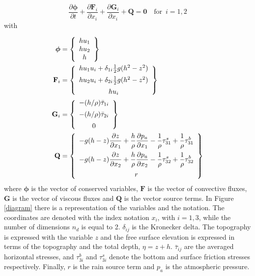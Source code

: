 \documentclass[a4paper,12pt]{article}
\newcommand{\pder}[2]{\frac{\partial#1}{\partial#2}}
\begin{document}
\begin{equation} \label{general_sw}
\pder{\bm{\phi}}{t} + \pder{\mathbf{F}_i}{x_i} + \pder{\mathbf{G}_i}{x_i} + \mathbf{Q} = \mathbf{0} \quad \text{for} \enspace i=1,2
\end{equation}
with

\begin{subequations}\label{variables_and_fluxes}
\allowdisplaybreaks
\begin{align}
\bm{\phi} &= \left\{
    \begin{array}{c}
        hu_1 \\
        hu_2 \\
        h
    \end{array}\right\} \\
\mathbf{F}_i &= \left\{
    \begin{array}{c}
        hu_1u_i + \delta_{1i}\frac{1}{2}g(h^2 - z^2) \\ [5pt]
        hu_2u_i + \delta_{2i}\frac{1}{2}g(h^2 - z^2) \\ [5pt]
        hu_i
    \end{array}\right\} \\
\mathbf{G}_i &= \left\{
    \begin{array}{c}
        -(h/\rho) \bar{\tau}_{1i} \\ [5pt]
        -(h/\rho) \bar{\tau}_{2i} \\ [5pt]
        0
    \end{array}\right\} \\
\mathbf{Q} &= \left\{
    \begin{array}{c}
        \displaystyle -g(h-z)\pder{z}{x_1} + \frac{h}{\rho}\pder{p_a}{x_1}
        - \frac{1}{\rho}\tau^s_{31} + \frac{1}{\rho}\tau^b_{31} \\ [10pt]
        \displaystyle -g(h-z)\pder{z}{x_2} + \frac{h}{\rho}\pder{p_a}{x_2}
        - \frac{1}{\rho}\tau^s_{32} + \frac{1}{\rho}\tau^b_{32} \\ [10pt]
        r
    \end{array}\right\}
\end{align}
\end{subequations}
where $\bm{\phi}$ is the vector of conserved variables, $\mathbf{F}$ is the vector of convective fluxes, $\mathbf{G}$ is the vector of viscous fluxes and $\mathbf{Q}$ is the vector source terms. In Figure \ref{diagram} there is a representation of the variables and the notation. The coordinates are denoted with the index notation $x_i$, with $i=1,3$, while the number of dimensions $n_d$ is equal to 2. $\delta_{ij}$ is the Kronecker delta. The topography is expressed with the variable $z$ and the free surface elevation is expressed in terms of the topography and the total depth, $\eta = z + h$. $\bar{\tau}_{ij}$ are the averaged horizontal stresses, and $\tau^b_{3i}$ and $\tau^s_{3i}$ denote the bottom and surface friction stresses respectively. Finally, $r$ is the rain source term and $p_a$ is the atmospheric pressure.
\end{document}
